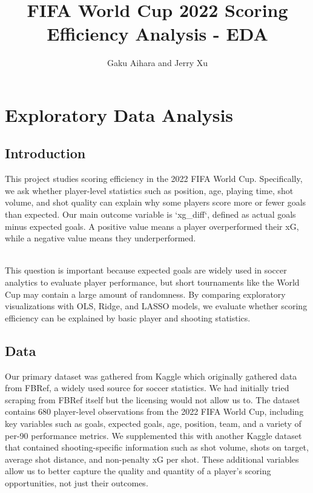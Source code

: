 \documentclass[
  letterpaper,
  DIV=11,
  numbers=noendperiod]{scrartcl}
\title{FIFA World Cup 2022 Scoring Efficiency Analysis - EDA}
\author{Gaku Aihara and Jerry Xu}
\date{}
\begin{document}
\maketitle


\section{Exploratory Data Analysis}\label{exploratory-data-analysis}

\subsection{Introduction}\label{introduction}

This project studies scoring efficiency in the 2022 FIFA World Cup.
Specifically, we ask whether player-level statistics such as position,
age, playing time, shot volume, and shot quality can explain why some
players score more or fewer goals than expected. Our main outcome
variable is `xg\_diff`, defined as actual goals minus expected goals. A
positive value means a player overperformed their xG, while a negative
value means they underperformed.\\
\strut \\
This question is important because expected goals are widely used in
soccer analytics to evaluate player performance, but short tournaments
like the World Cup may contain a large amount of randomness. By
comparing exploratory visualizations with OLS, Ridge, and LASSO models,
we evaluate whether scoring efficiency can be explained by basic player
and shooting statistics.

\subsection{Data}\label{data}

Our primary dataset was gathered from Kaggle which originally gathered
data from FBRef, a widely used source for soccer statistics. We had
initially tried scraping from FBRef itself but the licensing would not
allow us to. The dataset contains 680 player-level observations from the
2022 FIFA World Cup, including key variables such as goals, expected
goals, age, position, team, and a variety of per-90 performance metrics.
We supplemented this with another Kaggle dataset that contained
shooting-specific information such as shot volume, shots on target,
average shot distance, and non-penalty xG per shot. These additional
variables allow us to better capture the quality and quantity of a
player's scoring opportunities, not just their outcomes.
\end{document}

